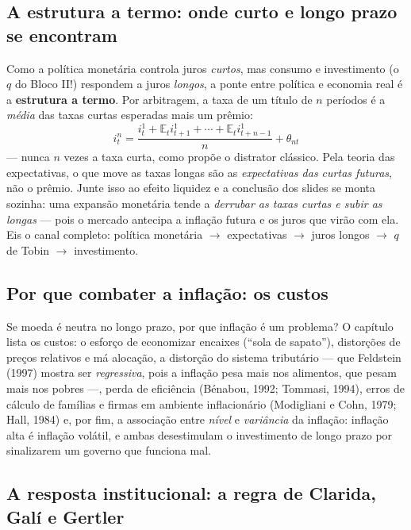 \documentclass[12pt, a4paper]{article}
\newcommand{\E}{\mathbb{E}}
\begin{document}
\subsection{A estrutura a termo: onde curto e longo prazo se encontram}

Como a política monetária controla juros \emph{curtos}, mas consumo e
investimento (o $q$ do Bloco II!) respondem a juros \emph{longos}, a ponte
entre política e economia real é a \textbf{estrutura a termo}. Por
arbitragem, a taxa de um título de $n$ períodos é a \emph{média} das taxas
curtas esperadas mais um prêmio:
\[
i_t^n = \frac{i_t^1 + \E_t i_{t+1}^1 + \cdots + \E_t i_{t+n-1}^1}{n}
+ \theta_{nt}
\]
--- nunca $n$ vezes a taxa curta, como propõe o distrator clássico. Pela
teoria das expectativas, o que move as taxas longas são as
\emph{expectativas das curtas futuras}, não o prêmio. Junte isso ao efeito
liquidez e a conclusão dos slides se monta sozinha: uma expansão monetária
tende a \emph{derrubar as taxas curtas e subir as longas} --- pois o mercado
antecipa a inflação futura e os juros que virão com ela. Eis o canal completo:
política monetária $\to$ expectativas $\to$ juros longos $\to$ $q$ de Tobin
$\to$ investimento.

\subsection{Por que combater a inflação: os custos}

Se moeda é neutra no longo prazo, por que inflação é um problema? O capítulo
lista os custos: o esforço de economizar encaixes (``sola de sapato''),
distorções de preços relativos e má alocação, a distorção do sistema
tributário --- que Feldstein (1997) mostra ser \emph{regressiva}, pois a
inflação pesa mais nos alimentos, que pesam mais nos pobres ---, perda de
eficiência (Bénabou, 1992; Tommasi, 1994), erros de cálculo de famílias e
firmas em ambiente inflacionário (Modigliani e Cohn, 1979; Hall, 1984) e, por
fim, a associação entre \emph{nível} e \emph{variância} da inflação: inflação
alta é inflação volátil, e ambas desestimulam o investimento de longo prazo
por sinalizarem um governo que funciona mal.

\subsection{A resposta institucional: a regra de Clarida, Galí e Gertler}
\end{document}

